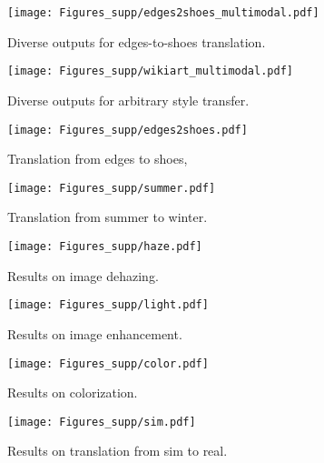 \documentclass[runningheads]{llncs}
\begin{document}
\begin{figure*}
  \centering
  \texttt{[image: Figures\_supp/edges2shoes\_multimodal.pdf]}
  \caption{Diverse outputs for edges-to-shoes translation.}
  \label{fig:edge2shoe_multimodal}
\end{figure*}

\begin{figure*}
  \centering
  \texttt{[image: Figures\_supp/wikiart\_multimodal.pdf]}
  \caption{Diverse outputs for arbitrary style transfer.}
  \label{fig:wikiart_multimodal}
\end{figure*}

\begin{figure*}
  \centering
  \texttt{[image: Figures\_supp/edges2shoes.pdf]}
  \caption{Translation from edges to shoes\cite{xie15hed},\cite{fine-grained}}
  \label{fig:edge2shoe}
\end{figure*}

\begin{figure*}
  \centering
  \texttt{[image: Figures\_supp/summer.pdf]}
  \caption{Translation from summer to winter\cite{zhu2017unpaired}.}
  \label{fig:summer}
\end{figure*}

\begin{figure*}
  \centering
  \texttt{[image: Figures\_supp/haze.pdf]}
  \caption{Results on image dehazing.\cite{Dense-Haze_2019}}
  \label{fig:haze}
\end{figure*}

\begin{figure*}
  \centering
  \texttt{[image: Figures\_supp/light.pdf]}
  \caption{Results on image enhancement\cite{wei2018deep}.}
  \label{fig:light}
\end{figure*}

\begin{figure*}
  \centering
  \texttt{[image: Figures\_supp/color.pdf]}
  \caption{Results on colorization\cite{anwar2020image}.}
  \label{fig:color}
\end{figure*}

\begin{figure*}
  \centering
  \texttt{[image: Figures\_supp/sim.pdf]}
  \caption{Results on translation from sim to real\cite{zia2021surgical}.}
  \label{fig:sim}
\end{figure*}

\clearpage



\end{document}
